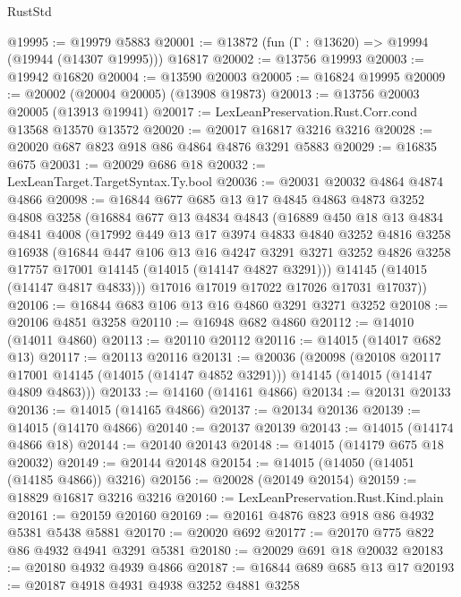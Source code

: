 \begin{lexlean}{RustStd}
\begin{coremodule}
@19995 := @19979 @5883
@20001 := @13872 (fun (Γ : @13620) => @19994 (@19944 (@14307 @19995))) @16817
@20002 := @13756 @19993
@20003 := @19942 @16820
@20004 := @13590 @20003
@20005 := @16824 @19995
@20009 := @20002 (@20004 @20005) (@13908 @19873)
@20013 := @13756 @20003 @20005 (@13913 @19941)
@20017 := LexLeanPreservation.Rust.Corr.cond @13568 @13570 @13572
@20020 := @20017 @16817 @3216 @3216
@20028 := @20020 @687 @823 @918 @86 @4864 @4876 @3291 @5883
@20029 := @16835 @675
@20031 := @20029 @686 @18
@20032 := LexLeanTarget.TargetSyntax.Ty.bool
@20036 := @20031 @20032 @4864 @4874 @4866
@20098 := @16844
    @677
    @685
    @13
    @17
    @4845
    @4863
    @4873
    @3252
    @4808
    @3258
    (@16884
      @677
      @13
      @4834
      @4843
      (@16889
        @450
        @18
        @13
        @4834
        @4841
        @4008
        (@17992
          @449
          @13
          @17
          @3974
          @4833
          @4840
          @3252
          @4816
          @3258
          @16938
          (@16844
            @447
            @106
            @13
            @16
            @4247
            @3291
            @3271
            @3252
            @4826
            @3258
            @17757
            @17001
            @14145
            (@14015 (@14147 @4827 @3291)))
          @14145
          (@14015 (@14147 @4817 @4833)))
        @17016
        @17019
        @17022
        @17026
        @17031
        @17037))
@20106 := @16844 @683 @106 @13 @16 @4860 @3291 @3271 @3252
@20108 := @20106 @4851 @3258
@20110 := @16948 @682 @4860
@20112 := @14010 (@14011 @4860)
@20113 := @20110 @20112
@20116 := @14015 (@14017 @682 @13)
@20117 := @20113 @20116
@20131 := @20036
    (@20098
      (@20108 @20117 @17001 @14145 (@14015 (@14147 @4852 @3291)))
      @14145
      (@14015 (@14147 @4809 @4863)))
@20133 := @14160 (@14161 @4866)
@20134 := @20131 @20133
@20136 := @14015 (@14165 @4866)
@20137 := @20134 @20136
@20139 := @14015 (@14170 @4866)
@20140 := @20137 @20139
@20143 := @14015 (@14174 @4866 @18)
@20144 := @20140 @20143
@20148 := @14015 (@14179 @675 @18 @20032)
@20149 := @20144 @20148
@20154 := @14015 (@14050 (@14051 (@14185 @4866)) @3216)
@20156 := @20028 (@20149 @20154)
@20159 := @18829 @16817 @3216 @3216
@20160 := LexLeanPreservation.Rust.Kind.plain
@20161 := @20159 @20160
@20169 := @20161 @4876 @823 @918 @86 @4932 @5381 @5438 @5881
@20170 := @20020 @692
@20177 := @20170 @775 @822 @86 @4932 @4941 @3291 @5381
@20180 := @20029 @691 @18 @20032
@20183 := @20180 @4932 @4939 @4866
@20187 := @16844 @689 @685 @13 @17
@20193 := @20187 @4918 @4931 @4938 @3252 @4881 @3258

\end{coremodule}
\end{lexlean}
